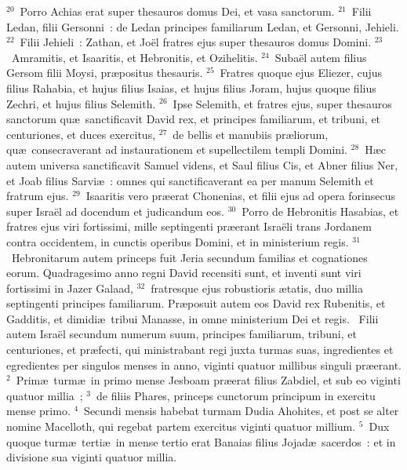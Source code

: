 ${}^{20}$~Porro Achias erat super thesauros domus Dei, et vasa sanctorum.
${}^{21}$~Filii Ledan, filii Gersonni~: de Ledan principes familiarum Ledan, et Gersonni, Jehieli.
${}^{22}$~Filii Jehieli~: Zathan, et Jo\"el fratres ejus super thesauros domus Domini.
${}^{23}$~Amramitis, et Isaaritis, et Hebronitis, et Ozihelitis.
${}^{24}$~Suba\"el autem filius Gersom filii Moysi, pr\ae positus thesauris.
${}^{25}$~Fratres quoque ejus Eliezer, cujus filius Rahabia, et hujus filius Isaias, et hujus filius Joram, hujus quoque filius Zechri, et hujus filius Selemith.
${}^{26}$~Ipse Selemith, et fratres ejus, super thesauros sanctorum qu\ae\ sanctificavit David rex, et principes familiarum, et tribuni, et centuriones, et duces exercitus,
${}^{27}$~de bellis et manubiis pr\ae liorum, qu\ae\ consecraverant ad instaurationem et supellectilem templi Domini.
${}^{28}$~H\ae c autem universa sanctificavit Samuel videns, et Saul filius Cis, et Abner filius Ner, et Joab filius Sarvi\ae~: omnes qui sanctificaverant ea per manum Selemith et fratrum ejus.
${}^{29}$~Isaaritis vero pr\ae erat Chonenias, et filii ejus ad opera forinsecus super Isra\"el ad docendum et judicandum eos.
${}^{30}$~Porro de Hebronitis Hasabias, et fratres ejus viri fortissimi, mille septingenti pr\ae erant Isra\"eli trans Jordanem contra occidentem, in cunctis operibus Domini, et in ministerium regis.
${}^{31}$~Hebronitarum autem princeps fuit Jeria secundum familias et cognationes eorum. Quadragesimo anno regni David recensiti sunt, et inventi sunt viri fortissimi in Jazer Galaad,
${}^{32}$~fratresque ejus robustioris \ae tatis, duo millia septingenti principes familiarum. Pr\ae posuit autem eos David rex Rubenitis, et Gadditis, et dimidi\ae\ tribui Manasse, in omne ministerium Dei et regis.
~\lettrine[lines=10,image=true,loversize=0.05,lraise=-0.03]{F}{}ilii autem Isra\"el secundum numerum suum, principes familiarum, tribuni, et centuriones, et pr\ae fecti, qui ministrabant regi juxta turmas suas, ingredientes et egredientes per singulos menses in anno, viginti quatuor millibus singuli pr\ae erant.
${}^{2}$~Prim\ae\ turm\ae\ in primo mense Jesboam pr\ae erat filius Zabdiel, et sub eo viginti quatuor millia~;
${}^{3}$~de filiis Phares, princeps cunctorum principum in exercitu mense primo.
${}^{4}$~Secundi mensis habebat turmam Dudia Ahohites, et post se alter nomine Macelloth, qui regebat partem exercitus viginti quatuor millium.
${}^{5}$~Dux quoque turm\ae\ terti\ae\ in mense tertio erat Banaias filius Jojad\ae\ sacerdos~: et in divisione sua viginti quatuor millia.
